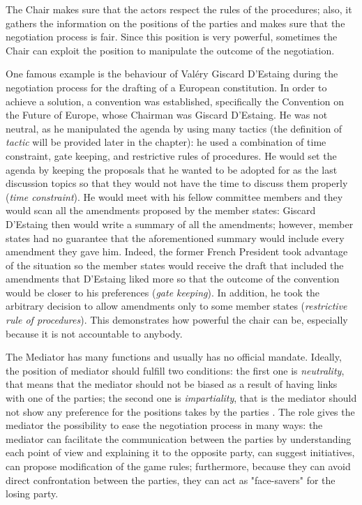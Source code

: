 \documentclass[../main.tex]{subfiles}
\begin{document}
The Chair makes sure that the actors respect the rules of the procedures; also, it gathers the information on the positions of the parties and makes sure that the negotiation process is fair. Since this position is very powerful, sometimes the Chair can exploit the position to manipulate the outcome of the negotiation.

One famous example is the behaviour of Valéry Giscard D'Estaing during the negotiation process for the drafting of a European constitution. In order to achieve a solution, a convention was established, specifically the Convention on the Future of Europe, whose Chairman was Giscard D'Estaing. He was not neutral, as he manipulated the agenda by using many tactics (the definition of \textit{tactic} will be provided later in the chapter): he used a combination of time constraint, gate keeping, and restrictive rules of procedures. He would set the agenda by keeping the proposals that he wanted to be adopted for as the last discussion topics so that they would not have the time to discuss them properly (\textit{time constraint}). He would meet with his fellow committee members and they would scan all the amendments proposed by the member states: Giscard D'Estaing then would write a summary of all the amendments; however, member states had no guarantee that the aforementioned summary would include every amendment they gave him. Indeed, the former French President took advantage of the situation so the member states would receive the draft that included the amendments that D'Estaing liked more so that the outcome of the convention would be closer to his preferences (\textit{gate keeping}). In addition, he took the arbitrary decision to allow amendments only to some member states (\textit{restrictive rule of procedures}). This demonstrates how powerful the chair can be, especially because it is not accountable to anybody.

The Mediator has many functions and usually has no official mandate. Ideally, the position of mediator should fulfill two conditions: the first one is \textit{neutrality}, that means that the mediator should not be biased as a result of having links with one of the parties; the second one is \textit{impartiality}, that is the mediator should not show any preference for the positions takes by the parties \autocite[6]{ropers1997roles}. The role gives the mediator the possibility to ease the negotiation process in many ways: the mediator can facilitate the communication between the parties by understanding each point of view and explaining it to the opposite party, can suggest initiatives, can propose modification of the game rules; furthermore, because they can avoid direct confrontation between the parties, they can act as "face-savers" for the losing party.
\end{document}
